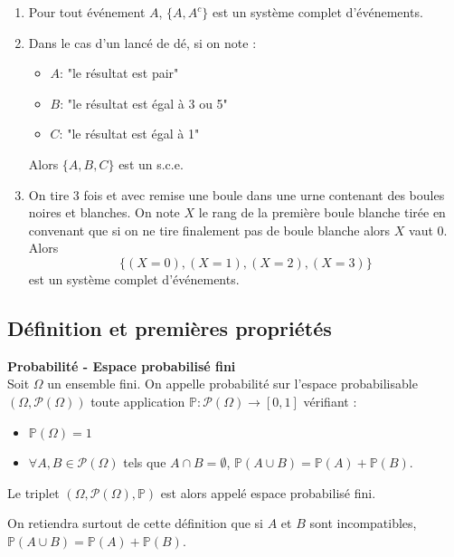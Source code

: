 \documentclass[../PolyS4.tex]{subfiles}
\begin{document}
\begin{Ex}
\begin{enumerate}
\item Pour tout événement $A$, $\{A, A^c\}$ est un système complet d'événements.
\item Dans le cas d'un lancé de dé, si on note :
\begin{itemize}
    \item $A$: "le résultat est pair"
    \item $B$: "le résultat est égal à 3 ou 5"
    \item $C$: "le résultat est égal à 1"
\end{itemize}
Alors $\{A, B, C\}$ est un s.c.e.
\item On tire 3 fois et avec remise une boule dans une urne contenant des boules noires et blanches. On note $X$ le rang de la première boule blanche tirée en convenant que si on ne tire finalement pas de boule blanche alors $X$ vaut 0. Alors 
\[
\{(X = 0), (X = 1), (X = 2), (X = 3)\}
\] 
est un système complet d'événements.
\end{enumerate}
\end{Ex}



\subsection{Définition et premières propriétés}

\begin{Def}\textbf{Probabilité - Espace probabilisé fini }\\

Soit $\Omega$ un ensemble fini. On appelle probabilité sur l'espace probabilisable $(\Omega, \mathcal{P}(\Omega))$ toute application $\mathbb{P} : \mathcal{P}(\Omega) \rightarrow [0, 1]$ vérifiant :
\begin{itemize}
    \item[1.] $\mathbb{P}(\Omega) = 1$
    \item[2.] $\forall A, B \in \mathcal{P}(\Omega)$ tels que $A \cap B = \emptyset$, $\mathbb{P}(A \cup B) = \mathbb{P}(A) + \mathbb{P}(B)$.
\end{itemize}
Le triplet $(\Omega, \mathcal{P}(\Omega), \mathbb{P})$ est alors appelé espace probabilisé fini.\\
\end{Def}

\begin{Rmq} 
On retiendra surtout de cette définition que si $A$ et $B$ sont incompatibles, $\mathbb{P}(A \cup B) = \mathbb{P}(A) + \mathbb{P}(B)$.\\
\end{Rmq} 
\end{document}
